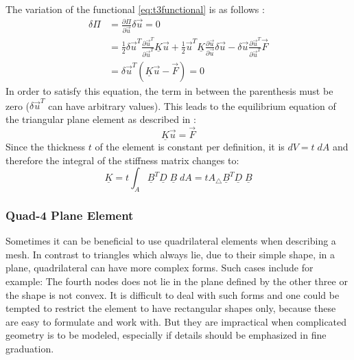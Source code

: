   The variation of the functional \ref{eq:t3functional} is as follows \cite{steinke2005finite}:
  \begin{align}
  \delta\Pi &= \frac{\partial\Pi}{\partial \vec{u}}\delta\vec{u} = 0 \nonumber\\
            &= \frac{1}{2}\delta\vec{u}^T\frac{\partial\vec{u}^T}{\partial\vec{u}^T}\underline{K}\vec{u} + \frac{1}{2}\vec{u}^T\underline{K}\frac{\partial\vec{u}}{\partial\vec{u}}\delta\vec{u} - \delta\vec{u}\frac{\partial\vec{u}^T}{\partial\vec{u}^T}\vec{F} \nonumber\\
            &= \delta\vec{u}^T\left(\underline{K}\vec{u}-\vec{F}\right) = 0
  \end{align}
  In order to satisfy this equation, the term in between the parenthesis must be zero ($\delta\vec{u}^T$ can have arbitrary values). This leads to the equilibrium equation of the triangular plane element as described in \cite{steinke2005finite}:
  \begin{equation}
  \underline{K}\vec{u} = \vec{F}
  \end{equation}
  Since the thickness $t$ of the element is constant per definition, it is $dV = t\;dA$ and therefore the integral of the stiffness matrix changes to:
  \begin{equation}
  \underline{K} = t \int_A \underline{B}^T\underline{D}\;\underline{B}\;dA = t A_\triangle \underline{B}^T\underline{D}\;\underline{B}
  \end{equation}
  
  
  
  \subsubsection{Quad-4 Plane Element}
  Sometimes it can be beneficial to use quadrilateral elements when describing a mesh. In contrast to triangles which always lie, due to their simple shape, in a plane, quadrilateral can have more complex forms. Such cases include for example: The fourth nodes does not lie in the plane defined by the other three or the shape is not convex. It is difficult to deal with such forms and one could be tempted to restrict the element to have rectangular shapes only, because these are easy to formulate and work with. But they are impractical when complicated geometry is to be modeled, especially if details should be emphasized in fine graduation.
    
